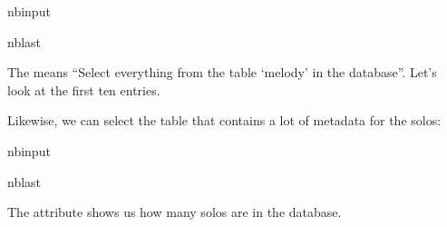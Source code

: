 \documentclass[letterpaper,10pt,english]{sphinxmanual}
\begin{document}
\begin{sphinxuseclass}{nbinput}
\begin{sphinxuseclass}{nblast}
{
\begin{sphinxVerbatim}[commandchars=\\\{\}]
\llap{\color{nbsphinxin}[4]:\,\hspace{\fboxrule}\hspace{\fboxsep}}   
\end{sphinxVerbatim}
}

\end{sphinxuseclass}
\end{sphinxuseclass}
\sphinxAtStartPar
The  means “Select everything from the table ‘melody’ in the database”. Let’s look at the first ten entries.

\sphinxAtStartPar
Likewise, we can select the  table that contains a lot of metadata for the solos:

\begin{sphinxuseclass}{nbinput}
\begin{sphinxuseclass}{nblast}
{
\begin{sphinxVerbatim}[commandchars=\\\{\}]
\llap{\color{nbsphinxin}[5]:\,\hspace{\fboxrule}\hspace{\fboxsep}}   
\end{sphinxVerbatim}
}

\end{sphinxuseclass}
\end{sphinxuseclass}
\sphinxAtStartPar
The  attribute shows us how many solos are in the database.
\end{document}
